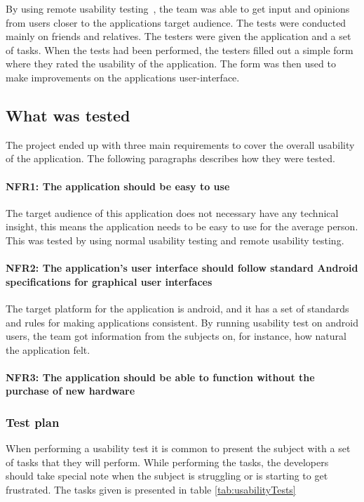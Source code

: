 
By using remote usability testing~\cite{remoteTest}, the team was able to get input and opinions from users closer to the applications target audience.
The tests were conducted mainly on friends and relatives. The testers were given the application and a set of tasks. When the tests had been performed, the testers filled out a simple form where they rated the usability of the application. The form was then used to make improvements on the applications user-interface.

\subsection{What was tested}
The project ended up with three main requirements to cover the overall usability of the application. The following paragraphs describes how they were tested.

\paragraph{NFR1: The application should be easy to use}
The target audience of this application does not necessary have any technical insight, this means the application needs to be easy to use for the average person. This was tested by using normal usability testing and remote usability testing.

\paragraph{NFR2: The application's user interface should follow standard Android specifications for graphical user interfaces}
The target platform for the application is android, and it has a set of standards and rules for making applications consistent.
By running usability test on android users, the team got information from the subjects on, for instance, how natural the application felt.

\paragraph{NFR3: The application should be able to function without the purchase of new hardware}


\subsubsection{Test plan}
When performing a usability test it is common to present the subject with a set of tasks that they will perform. While performing the tasks, the developers should take special note when the subject is struggling or is starting to get frustrated. The tasks given is presented in table \ref{tab:usabilityTests}

